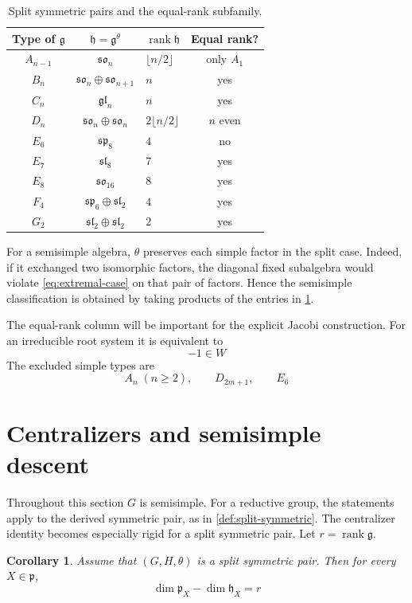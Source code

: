 \documentclass[11pt]{amsart}
\newtheorem{corollary}[corollary]{Corollary}
\theoremstyle{definition}
\theoremstyle{remark}
\newcommand{\rank}{\operatorname{rank}}
\newcommand{\g}{\mathfrak g}
\newcommand{\h}{\mathfrak h}
\newcommand{\p}{\mathfrak p}
\newcommand{\slie}{\mathfrak{sl}}
\newcommand{\glie}{\mathfrak{gl}}
\newcommand{\splie}{\mathfrak{sp}}
\newcommand{\solie}{\mathfrak{so}}
\begin{document}
\begin{table}[ht]
\centering
\renewcommand{\arraystretch}{1.12}
\begin{tabular}{@{}cclc@{}}
\toprule
Type of $\g$ & $\h=\g^\theta$ & $\rank\h$ & Equal rank?\\
\midrule
$A_{n-1}$ & $\solie_n$ & $\lfloor n/2\rfloor$ & only $A_1$\\
$B_n$ & $\solie_n\oplus\solie_{n+1}$ & $n$ & yes\\
$C_n$ & $\glie_n$ & $n$ & yes\\
$D_n$ & $\solie_n\oplus\solie_n$ & $2\lfloor n/2\rfloor$ & $n$ even\\
$E_6$ & $\splie_8$ & $4$ & no\\
$E_7$ & $\slie_8$ & $7$ & yes\\
$E_8$ & $\solie_{16}$ & $8$ & yes\\
$F_4$ & $\splie_6\oplus\slie_2$ & $4$ & yes\\
$G_2$ & $\slie_2\oplus\slie_2$ & $2$ & yes\\
\bottomrule
\end{tabular}
\caption{Split symmetric pairs and the equal-rank subfamily.}
\label{tab:classification}
\end{table}

For a semisimple algebra, $\theta$ preserves each simple factor in the
split case.  Indeed, if it exchanged two isomorphic factors, the
diagonal fixed subalgebra would violate \eqref{eq:extremal-case} on
that pair of factors.  Hence the semisimple classification is obtained by
taking products of the entries in \cref{tab:classification}.

The equal-rank column will be important for the explicit Jacobi construction.
For an irreducible root system it is equivalent to
\[
 -1\in W
\]
The excluded simple types are
\[
 A_n\;(n\geq2),\qquad D_{2m+1},\qquad E_6
\]

\section{Centralizers and semisimple descent}

Throughout this section $G$ is semisimple.  For a reductive group, the
statements apply to the derived symmetric pair, as in
\cref{def:split-symmetric}.  The centralizer identity becomes especially
rigid for a split symmetric pair.  Let $r=\rank\g$.

\begin{corollary}\label{cor:split-centralizers}
Assume that $(G,H,\theta)$ is a split symmetric pair.  Then for every $X\in\p$,
\begin{equation}\label{eq:split-centralizer-difference}
 \dim\p_X-\dim\h_X=r
\end{equation}
\end{corollary}
\end{document}
